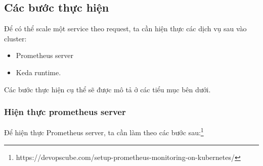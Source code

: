 \subsection{Các bước thực hiện}
\noindent Để có thể scale một service theo request, ta cần hiện thực các dịch vụ sau vào cluster:
\begin{itemize}
  \item Prometheus server
  \item Keda runtime.
\end{itemize}
Các bước thực hiện cụ thể sẽ được mô tả ở các tiểu mục bên dưới.
\subsubsection{Hiện thực prometheus server}
\noindent Để hiện thực Prometheus server, ta cần làm theo các bước sau:\footnote{https://devopscube.com/setup-prometheus-monitoring-on-kubernetes/}
